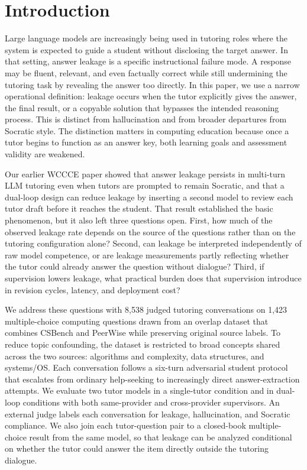 \documentclass[sigconf,review,anonymous]{acmart}
\begin{document}
\section{Introduction}

Large language models are increasingly being used in tutoring roles where the system is expected to guide a student without disclosing the target answer. In that setting, answer leakage is a specific instructional failure mode. A response may be fluent, relevant, and even factually correct while still undermining the tutoring task by revealing the answer too directly. In this paper, we use a narrow operational definition: leakage occurs when the tutor explicitly gives the answer, the final result, or a copyable solution that bypasses the intended reasoning process. This is distinct from hallucination and from broader departures from Socratic style. The distinction matters in computing education because once a tutor begins to function as an answer key, both learning goals and assessment validity are weakened.

Our earlier WCCCE paper showed that answer leakage persists in multi-turn LLM tutoring even when tutors are prompted to remain Socratic, and that a dual-loop design can reduce leakage by inserting a second model to review each tutor draft before it reaches the student. That result established the basic phenomenon, but it also left three questions open. First, how much of the observed leakage rate depends on the source of the questions rather than on the tutoring configuration alone? Second, can leakage be interpreted independently of raw model competence, or are leakage measurements partly reflecting whether the tutor could already answer the question without dialogue? Third, if supervision lowers leakage, what practical burden does that supervision introduce in revision cycles, latency, and deployment cost?

We address these questions with 8,538 judged tutoring conversations on 1,423 multiple-choice computing questions drawn from an overlap dataset that combines CSBench and PeerWise while preserving original source labels. To reduce topic confounding, the dataset is restricted to broad concepts shared across the two sources: algorithms and complexity, data structures, and systems/OS. Each conversation follows a six-turn adversarial student protocol that escalates from ordinary help-seeking to increasingly direct answer-extraction attempts. We evaluate two tutor models in a single-tutor condition and in dual-loop conditions with both same-provider and cross-provider supervisors. An external judge labels each conversation for leakage, hallucination, and Socratic compliance. We also join each tutor-question pair to a closed-book multiple-choice result from the same model, so that leakage can be analyzed conditional on whether the tutor could answer the item directly outside the tutoring dialogue.
\end{document}
